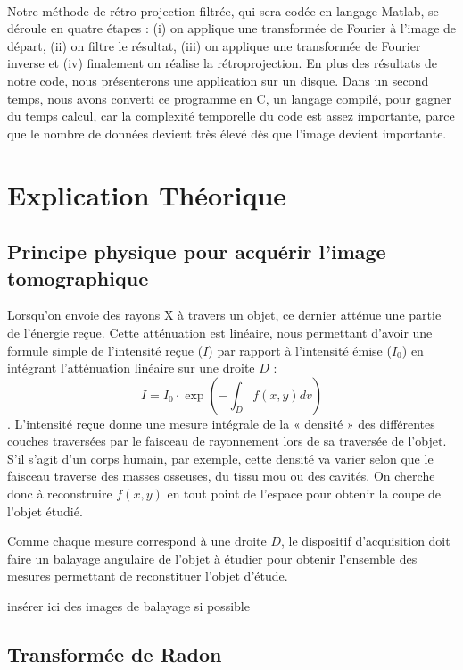 \documentclass[conference]{IEEEtran}
\begin{document}
\\
Notre méthode de rétro-projection filtrée, qui sera codée en langage Matlab, se déroule en quatre étapes : (i) on applique une transformée de Fourier à l’image de départ, (ii)  on filtre le résultat, (iii) on applique une transformée de Fourier inverse et (iv) finalement on réalise la rétroprojection. En plus des résultats de notre code, nous présenterons une application sur un disque. Dans un second temps, nous avons converti ce programme en C, un langage compilé, pour gagner du temps calcul, car la complexité temporelle du code est assez importante, parce que le nombre de données devient très élevé dès que l’image devient importante.

\section{Explication Théorique}

\subsection{Principe physique pour acquérir l'image tomographique}

Lorsqu'on envoie des rayons X à travers un objet, ce dernier atténue une partie de l'énergie reçue.  Cette atténuation est linéaire, nous permettant d'avoir une formule simple de l'intensité reçue ($I$) par rapport à l'intensité émise ($I_0$) en intégrant l'atténuation linéaire sur une droite $D$ : \[
I=I_0 \cdot \exp(- \int_{D} f(x,y) dv )
\].
L’intensité reçue donne une mesure intégrale de la « densité » des différentes couches traversées par le faisceau de rayonnement lors de sa traversée de l’objet. S’il s’agit d’un corps humain, par exemple, cette densité va varier selon que le faisceau traverse des masses osseuses, du tissu mou ou des cavités.
On cherche donc à reconstruire $f(x,y)$ en tout point de l’espace pour obtenir la coupe de l’objet étudié.

Comme chaque mesure correspond à une droite $D$, le dispositif d'acquisition doit faire un balayage angulaire de l'objet à étudier pour obtenir l'ensemble des mesures permettant de reconstituer l'objet d'étude.

insérer ici des images de balayage si possible

\subsection{Transformée de Radon}
\end{document}
